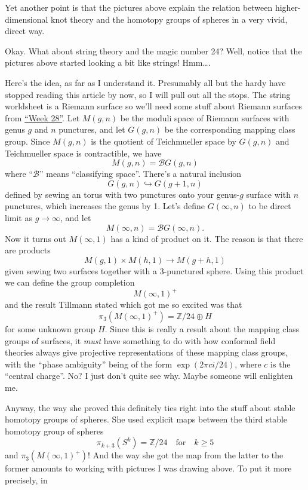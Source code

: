 \documentclass{article}
\begin{document}
Yet another point is that the pictures above explain the relation
between higher-dimensional knot theory and the homotopy groups of
spheres in a very vivid, direct way.

Okay. What about string theory and the magic number 24? Well, notice
that the pictures above started looking a bit like strings! Hmm\ldots.

Here's the idea, as far as I understand it. Presumably all but the hardy
have stopped reading this article by now, so I will pull out all the
stops. The string worldsheet is a Riemann surface so we'll need some
stuff about Riemann surfaces from \protect\hyperlink{week28}{``Week
28''}. Let \(M(g,n)\) be the moduli space of Riemann surfaces with genus
\(g\) and \(n\) punctures, and let \(G(g,n)\) be the corresponding
mapping class group. Since \(M(g,n)\) is the quotient of Teichmueller
space by \(G(g,n)\) and Teichmueller space is contractible, we have
\[M(g,n) = \mathcal{B}G(g,n)\] where ``\(\mathcal{B}\)'' means
``classifying space''. There's a natural inclusion
\[G(g,n)\hookrightarrow G(g+1,n)\] defined by sewing an torus with two
punctures onto your genus-\(g\) surface with \(n\) punctures, which
increases the genus by 1. Let's define \(G(\infty,n)\) to be direct
limit as \(g\to\infty\), and let
\[M(\infty,n) = \mathcal{B}G(\infty,n).\] Now it turns out
\(M(\infty,1)\) has a kind of product on it. The reason is that there
are products \[M(g,1)\times M(h,1)\to M(g+h,1)\] given sewing two
surfaces together with a 3-punctured sphere. Using this product we can
define the group completion \[M(\infty,1)^+\] and the result Tillmann
stated which got me so excited was that
\[\pi_3(M(\infty,1)^+) = \mathbb{Z}/24 \oplus H\] for some unknown group
\(H\). Since this is really a result about the mapping class groups of
surfaces, it \emph{must} have something to do with how conformal field
theories always give projective representations of these mapping class
groups, with the ``phase ambiguity'' being of the form
\(\exp(2\pi ci/24)\), where \(c\) is the ``central charge''. No? I just
don't quite see why. Maybe someone will enlighten me.

Anyway, the way she proved this definitely ties right into the stuff
about stable homotopy groups of spheres. She used explicit maps between
the third stable homotopy group of spheres
\[\pi_{k+3}(S^k) = \mathbb{Z}/24 \quad\text{for}\quad k \geqslant 5\]
and \(\pi_3(M(\infty,1)^+)\)! And the way she got the map from the
latter to the former amounts to working with pictures I was drawing
above. To put it more precisely, in
\end{document}
